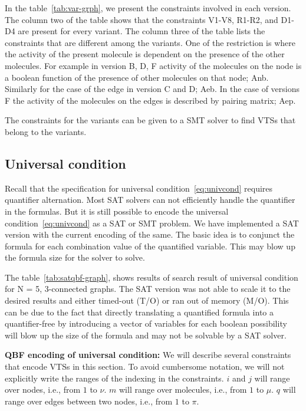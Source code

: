 In the table~\ref{tab:var-grph}, we present the constraints involved in each version.
%
The column two of the table shows that the constraints V1-V8, R1-R2, and D1-D4 are present
for every variant.
%
The column three of the table lists the constraints that are different among the variants.
%
%
One of the restriction is where the activity of the present molecule is dependent on the presence of the other molecules.
%
For example in version B, D, F activity of the molecules on the node is a boolean function of the presence of other molecules on that node; Anb.
%
Similarly for the case of the edge in version C and D; Aeb.
%
In the case of versions F the activity of the molecules on the edges
is described by pairing matrix; Aep.

%
The constraints for the variants can be given to a SMT solver to find
VTSs that belong to the variants.

\subsection{Universal condition}
Recall that the specification for universal condition~\ref{eq:univcond} requires quantifier alternation. 
%
Most SAT solvers can not efficiently handle the quantifier in the formulas. 
% 
But it is still possible to encode the universal condition~\ref{eq:univcond} as a SAT or SMT problem.
% 
We have implemented a SAT version with the current encoding of the same.
%
The basic idea is to conjunct the formula for each combination value of the quantified variable. 
%
This may blow up the formula size for the solver to solve.


%
The table~\ref{tab:satqbf-graph}, shows results of search result of universal condition for N = 5, 3-connected graphs. The SAT version was not able to scale it to the desired results and either timed-out (T/O) or ran out of memory (M/O).
%
This can be due to the fact that directly translating a quantified formula into a quantifier-free  by introducing a vector of variables for each boolean possibility will blow up the size of the formula and may not be solvable by a SAT solver.

\textbf{QBF encoding of universal condition:}
We will describe several constraints that encode VTSs in this section.
%
To avoid cumbersome notation, we will not explicitly write the ranges
of the indexing in the constraints.
%
$i$ and $j$ will range over nodes, i.e., from $1$ to $\nu$.
%
$m$ will range over molecules, i.e., from $1$ to $\mu$.
%
$q$ will range over edges between two nodes, i.e., from $1$ to $\pi$.
%

